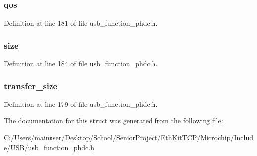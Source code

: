 \subsubsection[{qos}]{ qos}\label{struct_p_h_d_c___t_x___e_n_d_p_o_i_n_t___s_t_r_u_c_t_a992b69bcb851a8af26e51c2167b72fb5}


Definition at line 181 of file usb\+\_\+function\+\_\+phdc.\+h.

\hypertarget{struct_p_h_d_c___t_x___e_n_d_p_o_i_n_t___s_t_r_u_c_t_ac86594fb76193cdd5825e2a13c09f1bd}{}
\subsubsection[{size}]{ size}\label{struct_p_h_d_c___t_x___e_n_d_p_o_i_n_t___s_t_r_u_c_t_ac86594fb76193cdd5825e2a13c09f1bd}


Definition at line 184 of file usb\+\_\+function\+\_\+phdc.\+h.

\hypertarget{struct_p_h_d_c___t_x___e_n_d_p_o_i_n_t___s_t_r_u_c_t_a4bf75e6c826876c02decdae1f52a7a55}{}
\subsubsection[{transfer\+\_\+size}]{ transfer\+\_\+size}\label{struct_p_h_d_c___t_x___e_n_d_p_o_i_n_t___s_t_r_u_c_t_a4bf75e6c826876c02decdae1f52a7a55}


Definition at line 179 of file usb\+\_\+function\+\_\+phdc.\+h.



The documentation for this struct was generated from the following file\+:\begin{DoxyCompactItemize}
\item 
C\+:/\+Users/mainuser/\+Desktop/\+School/\+Senior\+Project/\+Eth\+Kit\+T\+C\+P/\+Microchip/\+Include/\+U\+S\+B/\hyperlink{usb__function__phdc_8h}{usb\+\_\+function\+\_\+phdc.\+h}\end{DoxyCompactItemize}
